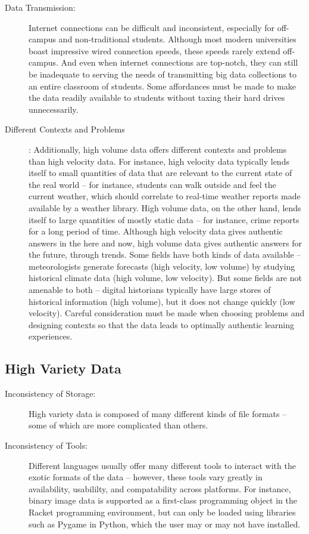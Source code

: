 \begin{description}
	\item[Data Transmission:] Internet connections can be difficult and inconsistent, especially for off-campus
and non-traditional students. Although most modern universities boast impressive wired connection
speeds, these speeds rarely extend off-campus. And even when internet connections are top-notch,
they can still be inadequate to serving the needs of transmitting big data collections to an entire
classroom of students. Some affordances must be made to make the data readily available to students without taxing their hard drives unnecessarily.
	\item[Different Contexts and Problems]: Additionally, high volume data offers different contexts and problems than high velocity data.
For instance, high velocity data typically lends itself to small quantities of data that are relevant to the current state of the real world -- for instance, students can walk outside and feel the current weather, which should correlate to real-time weather reports made available by a weather library.
High volume data, on the other hand, lends itself to large quantities of mostly static data -- for instance, crime reports for a long period of time.
Although high velocity data gives authentic answers in the here and now, high volume data gives authentic answers for the future, through trends.
Some fields have both kinds of data available -- meteorologists generate forecasts (high velocity, low volume) by studying historical climate data (high volume, low velocity).
But some fields are not amenable to both -- digital historians typically have large stores of historical information (high volume), but it does not change quickly (low velocity).
Careful consideration must be made when choosing problems and designing contexts so that the data leads to optimally authentic learning experiences.
\end{description}


\subsection{High Variety Data}

\begin{description}
\item[Inconsistency of Storage:] High variety data is composed of many different kinds of file formats -- some of which are more complicated than others.
\item[Inconsistency of Tools:] Different languages usually offer many different tools to interact with the exotic formats of the data -- however, these tools vary greatly in availability, usabililty, and compatability across platforms. For instance, binary image data is supported as a first-class programming object in the Racket programming environment, but can only be loaded using libraries such as Pygame in Python, which the user may or may not have installed.
\end{description}

